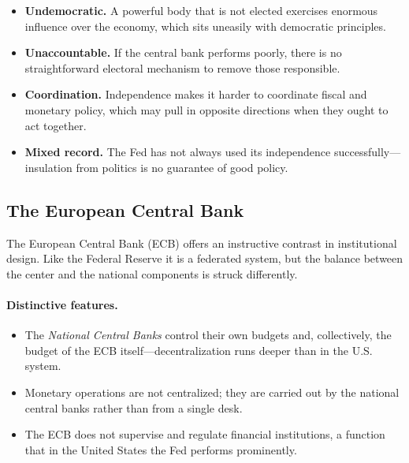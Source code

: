 \begin{itemize}
    \item \textbf{Undemocratic.} A powerful body that is not elected exercises enormous influence over the economy, which sits uneasily with democratic principles.
    \item \textbf{Unaccountable.} If the central bank performs poorly, there is no straightforward electoral mechanism to remove those responsible.
    \item \textbf{Coordination.} Independence makes it harder to coordinate fiscal and monetary policy, which may pull in opposite directions when they ought to act together.
    \item \textbf{Mixed record.} The Fed has not always used its independence successfully---insulation from politics is no guarantee of good policy.
\end{itemize}


\subsection{The European Central Bank}

The European Central Bank (ECB) offers an instructive contrast in institutional design. Like the Federal Reserve it is a federated system, but the balance between the center and the national components is struck differently.

\paragraph{Distinctive features.}
\begin{itemize}
    \item The \emph{National Central Banks} control their own budgets and, collectively, the budget of the ECB itself---decentralization runs deeper than in the U.S. system.
    \item Monetary operations are not centralized; they are carried out by the national central banks rather than from a single desk.
    \item The ECB does not supervise and regulate financial institutions, a function that in the United States the Fed performs prominently.
\end{itemize}

